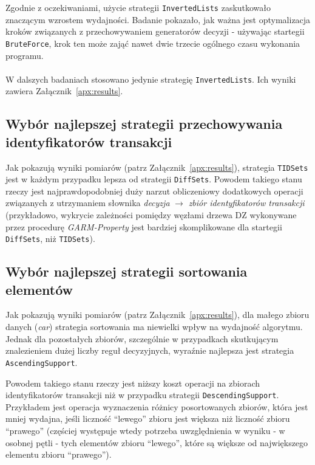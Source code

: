 \documentclass[a4paper,10pt]{article}
\begin{document}
 Zgodnie z oczekiwaniami, użycie strategii \verb+InvertedLists+ zaskutkowało znaczącym wzrostem wydajności.
 Badanie pokazało, jak ważna jest optymalizacja kroków związanych z przechowywaniem generatorów decyzji - używając startegii \verb+BruteForce+, krok ten może zająć nawet dwie trzecie ogólnego czasu wykonania programu.
 
 \paragraph{}
 W dalszych badaniach stosowano jedynie strategię \verb+InvertedLists+.
 Ich wyniki zawiera Załącznik~\ref{apx:results}.
 

 \subsection{Wybór najlepszej strategii przechowywania identyfikatorów transakcji}
 Jak pokazują wyniki pomiarów (patrz Załącznik~\ref{apx:results}), strategia \verb+TIDSets+ jest w każdym przypadku lepsza od strategii \verb+DiffSets+.
 Powodem takiego stanu rzeczy jest najprawdopodobniej duży narzut obliczeniowy dodatkowych operacji związanych z utrzymaniem słownika \emph{decyzja} $\rightarrow$ \emph{zbiór identyfikatorów transakcji} (przykładowo, wykrycie zależności pomiędzy węzłami drzewa DZ wykonywane przez procedurę \emph{GARM-Property} jest bardziej skomplikowane dla startegii \verb+DiffSets+, niż \verb+TIDSets+).
 
 
 \subsection{Wybór najlepszej strategii sortowania elementów}
 Jak pokazują wyniki pomiarów (patrz Załącznik~\ref{apx:results}), dla małego zbioru danych (\emph{car}) strategia sortowania ma niewielki wpływ na wydajność algorytmu.
 Jednak dla pozostałych zbiorów, szczególnie w przypadkach skutkującym znalezieniem dużej liczby reguł decyzyjnych, wyraźnie najlepsza jest strategia \verb+AscendingSupport+.
 
 Powodem takiego stanu rzeczy jest niższy koszt operacji na zbiorach identyfikatorów transakcji niż w przypadku strategii \verb+DescendingSupport+.
 Przykładem jest operacja wyznaczenia różnicy posortowanych zbiorów, która jest mniej wydajna, jeśli liczność ``lewego'' zbioru jest większa niż liczność zbioru ``prawego'' (częściej występuje wtedy potrzeba uwzględnienia w wyniku - w osobnej pętli - tych elementów zbioru ``lewego'', które są większe od największego elementu zbioru ``prawego'').
 
\end{document}
